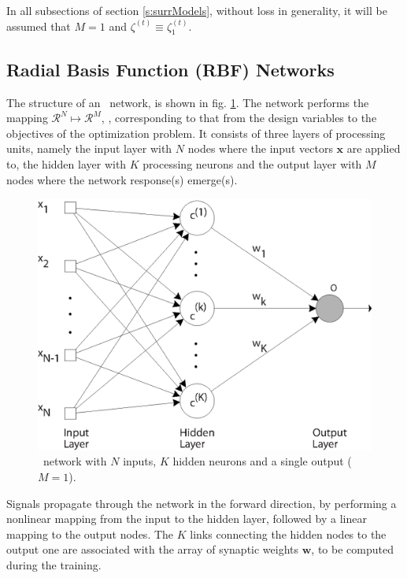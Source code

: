 \documentclass{vki_ls}
\newcommand{\vect}[1]{\bm{#1}}
\newcommand{\set}[1]{\mathcal{#1}}
\begin{document}
In all subsections of section \ref{s:surrModels}, without loss in generality, it will be assumed that $M\!=\!1$ and $\zeta^{(t)}\!\equiv\!\zeta^{(t)}_1$.
%
\subsection[Radial Basis Function Networks]
{Radial Basis Function (RBF) Networks}
\label{ss:RBF}

The structure of an \RBF\ network, is shown in fig. \ref{f:rbfn}. The network performs the mapping $\set{R}^N \!\mapsto\!\set{R}^M$, \cite{Pog1990, Hayk1999}, corresponding to that from the design variables to the objectives of the optimization problem.
It consists of three layers of processing units, namely the input layer with $N$ nodes where the input vectors $\vect{x}$ are applied to, the hidden layer with $K$ processing neurons and the output layer with $M$ nodes where the network response(s) emerge(s).
%
\begin{figure}
    \centering
    \includegraphics[scale=0.6]{rbfn.eps}
    \caption{\RBF\ network with $N$ inputs, $K$ hidden neurons and
            a single output ($M\!=\!1$).}
    \label{f:rbfn}
\end{figure}
%
Signals propagate through the network in the forward direction, by performing a nonlinear mapping from the input to the hidden layer, followed by a linear mapping to the output nodes.
The $K$ links connecting the hidden nodes to the output one are associated with the array of synaptic weights $\vect{w}$, to be computed during the training. 
\end{document}
